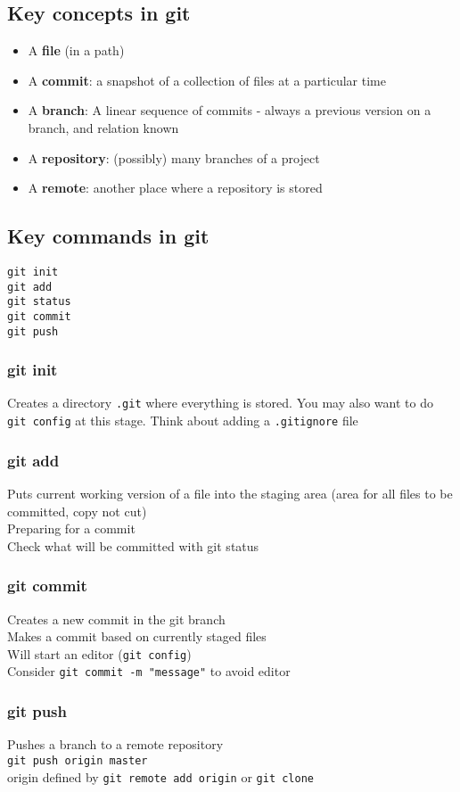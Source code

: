 \documentclass{article}[18pt]
\begin{document}
\subsection{Key concepts in git}
\begin{itemize}
\item A \textbf{file} (in a path)
\item A \textbf{commit}: a snapshot of a collection of files at a particular time
\item A \textbf{branch}: A linear sequence of commits - always a previous version on a branch, and relation known
\item A \textbf{repository}: (possibly) many branches of a project
\item A \textbf{remote}: another place where a repository is stored
\end{itemize}
\subsection{Key commands in git}
\begin{lstlisting}[mathescape=true]
git init
git add
git status
git commit
git push
\end{lstlisting}
\subsubsection{git init}
Creates a directory \texttt{.git} where everything is stored. You may also want to do \texttt{git config} at this stage. Think about adding a \texttt{.gitignore} file
\subsubsection{git add}
Puts current working version of a file into the staging area (area for all files to be committed, copy not cut)\\
Preparing for a commit\\
Check what will be committed with git status
\subsubsection{git commit}
Creates a new commit in the git branch\\
Makes a commit based on currently staged files\\
Will start an editor (\texttt{git config})\\
Consider \texttt{git commit -m "message"} to avoid editor
\subsubsection{git push}
Pushes a branch to a remote repository\\
\texttt{git push origin master}\\
origin defined by \texttt{git remote add origin} or \texttt{git clone}
\end{document}
